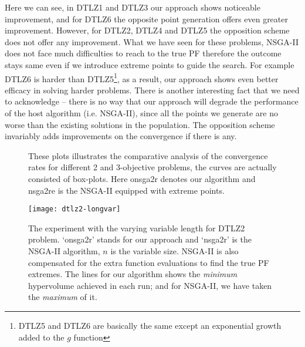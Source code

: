 \documentclass[journal]{IEEEtran}
\let\MYoriglatexcaption\caption
\renewcommand{\caption}[2][\relax]{\MYoriglatexcaption[#2]{#2}}
\begin{document}
Here we can see, in DTLZ1 and DTLZ3 our approach shows noticeable improvement, and for DTLZ6 the opposite point generation offers even greater improvement. However, for DTLZ2, DTLZ4 and DTLZ5 the opposition scheme does not offer any improvement. What we have seen for these problems, NSGA-II does not face much difficulties to reach to the true PF therefore the outcome stays same even if we introduce extreme points to guide the search. For example DTLZ6 is harder than DTLZ5\footnote{DTLZ5 and DTLZ6 are basically the same except an exponential growth added to the \(g\) function}, as a result, our approach shows even better efficacy in solving harder problems. There is another interesting fact that we need to acknowledge -- there is no way that our approach will degrade the performance of the host algorithm (i.e. NSGA-II), since all the points we generate are no worse than the existing solutions in the population. The opposition scheme invariably adds improvements on the convergence if there is any. 
%
\begin{figure*}[pb!]
	\centering
	\hfill
		\caption{These plots illustrates the comparative analysis of the convergence rates for different 2 and 3-objective problems, the curves are actually consisted of box-plots. Here onsga2r denotes our algorithm and nsga2re is the NSGA-II equipped with extreme points.}
	\label{plot:nsga2re-hv}
\end{figure*}
%
\begin{figure}[tp]
\centering
\texttt{[image: dtlz2-longvar]}
\caption{The experiment with the varying variable length for DTLZ2 problem. `onsga2r' stands for our approach and `nsga2r' is the NSGA-II algorithm, \(n\) is the variable size. NSGA-II is also compensated for the extra function evaluations to find the true PF extremes. The lines for our algorithm shows the \textit{minimum} hypervolume achieved in each run; and for NSGA-II, we have taken the \textit{maximum} of it.}
\label{plot:longvar}\vspace{-3.0pt}
\end{figure}
%
\end{document}
